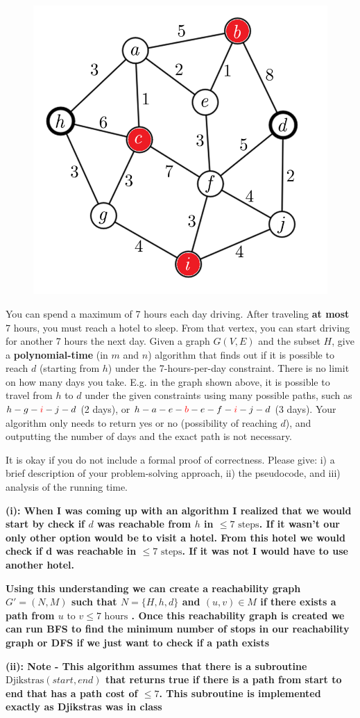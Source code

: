 \documentclass[addpoints]{exam}
\begin{document}
\begin{questions}
\begin{figure}[h!]
    \centering
    \includegraphics[width=0.35\linewidth]{hotels.png}
\end{figure}

You can spend a maximum of 7 hours each day driving. After traveling \textbf{at most} 7 hours, you must reach a hotel to sleep. From that vertex, you can start driving for another 7 hours the next day. Given a graph $G(V,E)$ and the subset $H$, give a \textbf{polynomial-time} (in $m$ and $n$) algorithm that finds out if it is possible to reach $d$ (starting from $h$) under the 7-hours-per-day constraint. There is no limit on how many days you take. E.g. in the graph shown above, it is possible to travel from $h$ to $d$ under the given constraints using many possible paths, such as $h-g-\textcolor{red}{i}-j-d$ (2 days), or $h-a-e-\textcolor{red}{b}-e-f-\textcolor{red}{i}-j-d$ (3 days). Your algorithm only needs to return yes or no (possibility of reaching $d$), and outputting the number of days and the exact path is not necessary.

It is okay if you do not include a formal proof of correctness. Please give: i) a brief description of your problem-solving approach, ii) the pseudocode, and iii) analysis of the running time. 

\textbf{(i): When I was coming up with an algorithm I realized that we would start by check if $d$ was reachable from $h$ in $\le 7 \text{ steps}$. If it wasn't our only other option would be to visit a hotel. From this hotel we would check if d was reachable in $\le 7 \text{ steps}$. If it was not I would have to use another hotel.}

\textbf{Using this understanding we can create a reachability graph $G' = (N, M)$ such that $N = \{H,h,d\} $ and $(u,v) \in M$ if there exists a path from $u \text{ to } v \le 7 \text{ hours}$ . Once this reachability graph is created we can run BFS to find the minimum number of stops in our reachability graph or DFS if we just want to check if a path exists}

\textbf{(ii): Note - This algorithm assumes that there is a subroutine $\text{Djikstras}(start, end)$ that returns true if there is a path from start to end that has a path cost of $\le 7$. This subroutine is implemented exactly as Djikstras was in class}


\end{questions}
\end{document}
